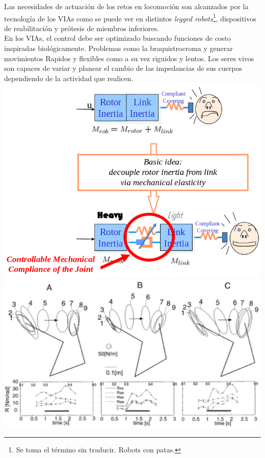 \documentclass[10pt,onecolumn,twoside,letterpaper]{article}
\begin{document}
Las necesidades de actuaci\'on de los retos en locomoci\'on son alcanzados por la tecnolog\'ia de los VIAs como se puede ver en distintos \emph{legged robots}\footnote{Se toma el t\'ermino sin traducir. Robots con patas.}, dispositivos de reabilitaci\'on y pr\'otesis de miembros inferiores.\cite{Vanderborght2013}\\
En los VIAs, el control debe ser optimizado buscando funciones de costo inspiradas biol\'ogicamente. Problemas como la braquistrocroma y generar movimientos Rapidos y flexibles como a su vez riguidos y lentos. Los seres vivos son capaces de variar y planear el cambio de las impedancias de sus cuerpos dependiendo de la actividad que realicen\cite{Albu-Schaeffer2009}.\\
\includegraphics[scale=0.4]{../../images/VIAsConcept.png}\cite{Albu-Schaeffer2009}\\
\includegraphics[scale=0.4]{../../images/HumanPlaningImpedance.png}\cite{Albu-Schaeffer2009}\\
\end{document}
